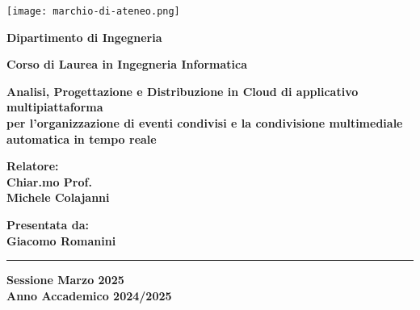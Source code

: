 
\begin{titlepage}
    
\pagestyle{empty}


\begin{center}

\texttt{[image: marchio-di-ateneo.png]}

\vspace{10mm}

{\large{\bf{Dipartimento di Ingegneria}}} 

\vspace{5mm}

{\Large{\bf{Corso di Laurea in Ingegneria Informatica}}}

\vspace{15mm}

{\Huge{\bf Analisi, Progettazione e Distribuzione in Cloud di applicativo multipiattaforma}}\\
\vspace{3mm}
{\Huge{\bf per l'organizzazione di eventi condivisi e la condivisione multimediale automatica in tempo reale}}\\
\vspace{3mm}
\vspace{3mm}

\end{center}

\vspace{10mm}

\begin{minipage}[t]{0.40\textwidth}
{\Large{\bf Relatore: \\ Chiar.mo Prof.\\ Michele Colajanni}}

\vspace{3mm}

{\Large{\bf }}
\end{minipage}
\hfill
\begin{minipage}[t]{0.40\textwidth}\raggedleft
{\Large{\bf Presentata da: \\ Giacomo Romanini}}
\end{minipage}

\vspace{30mm}

\rule[0.5cm]{15.8cm}{0.6mm}

\begin{center}
{\large{\bf Sessione Marzo 2025 \\}}
{\large{\bf Anno Accademico 2024/2025\\}}
\end{center}

\end{titlepage}

\restoregeometry
\newpage
